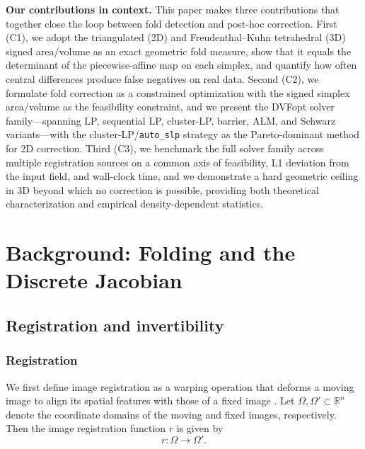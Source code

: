 \textbf{Our contributions in context.}
This paper makes three contributions that together close the loop between fold detection and post-hoc correction. First (C1), we adopt the triangulated (2D) and Freudenthal--Kuhn tetrahedral (3D) signed area/volume as an exact geometric fold measure, show that it equals the determinant of the piecewise-affine map on each simplex, and quantify how often central differences produce false negatives on real data. Second (C2), we formulate fold correction as a constrained optimization with the signed simplex area/volume as the feasibility constraint, and we present the DVFopt solver family---spanning LP, sequential LP, cluster-LP, barrier, ALM, and Schwarz variants---with the cluster-LP/\texttt{auto\_slp} strategy as the Pareto-dominant method for 2D correction. Third (C3), we benchmark the full solver family across multiple registration sources on a common axis of feasibility, L1 deviation from the input field, and wall-clock time, and we demonstrate a hard geometric ceiling in 3D beyond which no correction is possible, providing both theoretical characterization and empirical density-dependent statistics.


\section{Background: Folding and the Discrete Jacobian}
\label{sec:background_folding_jacobian}

\subsection{Registration and invertibility}
\label{sec:registration_and_invertibility}

\subsubsection{Registration}
\label{sec:registration}

We first define image registration as a warping operation that deforms a moving image to align its spatial features with those of a fixed image \cite{Yushkevich2023}. Let $\Omega, \Omega' \subset \mathbb{R}^n$ denote the coordinate domains of the moving and fixed images, respectively. Then the image registration function $r$ is given by 
\begin{equation} \label{eq:image_registration_definition}
    r: \Omega \rightarrow \Omega'.
\end{equation}

